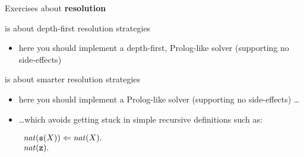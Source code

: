 \documentclass[presentation]{beamer}\mode<presentation>{\usetheme{AMSBolognaFC}}
\begin{document}
\begin{frame}[allowframebreaks]{Exercises about \textbf{resolution}}
    \label{slide:ex-res}
    \begin{description}
        \startExercise
        \item[\currentExercise] is about depth-first resolution strategies
        \begin{itemize}
            \item here you should implement a depth-first, Prolog-like solver (supporting no side-effects)
        \end{itemize} 

        \startExercise
        \item[\currentExercise] is about smarter resolution strategies
        \begin{itemize}
            \item here you should implement a Prolog-like solver (supporting no side-effects) \ldots
            \item \ldots which avoids getting stuck in simple recursive definitions such as:
            \begin{center}
                $\begin{array}{l}
                    \text{\textit{nat}}(\mathtt{s}(X)) \Leftarrow \text{\textit{nat}}(X) \mathtt{.}
                    \\
                    \text{\textit{nat}}(\mathtt{z}) \mathtt{.}
                \end{array}$
            \end{center}
        \end{itemize} 
    \end{description}
\end{frame}

\section*{}

\frame{\titlepage}

\section*{\refname}

\begin{frame}{\refname}
    \scriptsize
    
    
\end{frame}

\end{document}
